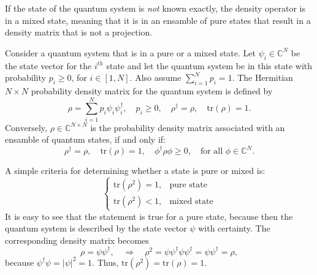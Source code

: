 \documentclass[11pt]{article}
\begin{document}
If the state of the quantum system is {\em not} known exactly, the density operator is in a mixed state, meaning that it
is in an ensamble of pure states that result in a density matrix that is not a projection.
\begin{definition}
  Consider a quantum system that is in a pure or a mixed state. Let $\psi_i\in{\mathbb C}^N$ be the
  state vector for the $i^{th}$ state and let the quantum system be in this state with probability
  $p_i\geq 0$, for $i\in[1,N]$. Also assume $\sum_{i=1}^N p_i = 1$. The Hermitian $N\times N$ probability density matrix
  for the quantum system is defined by
  \[
  \rho = \sum_{i=1}^N p_i \psi_i \psi_i^\dag,\quad p_i \geq 0,\quad \rho^\dag = \rho,\quad \mbox{tr$(\rho)$} = 1.
  \]
  Conversely, $\rho\in{\mathbb C}^{N\times N}$ is the probability density matrix associated with an ensamble of
  quantum states, if and only if:
  \[
  \rho^\dag = \rho,\quad \mbox{tr$(\rho)$} = 1,\quad
  \phi^\dag \rho \phi \geq 0,\quad \mbox{for all $\phi\in {\mathbb C}^N$}.
  \]
\end{definition}
%
A simple criteria for determining whether a state is pure or mixed is:
\[
\begin{cases} \mbox{tr$(\rho^2)= 1$},&\mbox{pure state}\\  \mbox{tr$(\rho^2)< 1$},&\mbox{mixed state} \end{cases}
\]
It is easy to see that the statement is true for a pure state, because then the quantum system is
described by the state vector $\psi$ with certainty. The corresponding density matrix becomes
\[
\rho = \psi \psi^\dag,\quad \Rightarrow \quad \rho^2 = \psi \psi^\dag \psi \psi^\dag = \psi \psi^\dag = \rho,
\]
because $\psi^\dag \psi = |\psi|^2 = 1$. Thus, $\mbox{tr$(\rho^2)$} = \mbox{tr$(\rho)= 1$}$.
\end{document}
